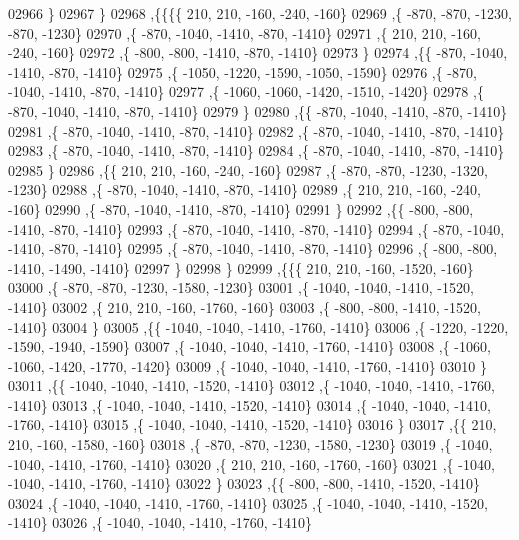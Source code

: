 \begin{DoxyCode}
02966    \}
02967   \}
02968  ,\{\{\{\{   210,   210,  -160,  -240,  -160\}
02969     ,\{  -870,  -870, -1230,  -870, -1230\}
02970     ,\{  -870, -1040, -1410,  -870, -1410\}
02971     ,\{   210,   210,  -160,  -240,  -160\}
02972     ,\{  -800,  -800, -1410,  -870, -1410\}
02973     \}
02974    ,\{\{  -870, -1040, -1410,  -870, -1410\}
02975     ,\{ -1050, -1220, -1590, -1050, -1590\}
02976     ,\{  -870, -1040, -1410,  -870, -1410\}
02977     ,\{ -1060, -1060, -1420, -1510, -1420\}
02978     ,\{  -870, -1040, -1410,  -870, -1410\}
02979     \}
02980    ,\{\{  -870, -1040, -1410,  -870, -1410\}
02981     ,\{  -870, -1040, -1410,  -870, -1410\}
02982     ,\{  -870, -1040, -1410,  -870, -1410\}
02983     ,\{  -870, -1040, -1410,  -870, -1410\}
02984     ,\{  -870, -1040, -1410,  -870, -1410\}
02985     \}
02986    ,\{\{   210,   210,  -160,  -240,  -160\}
02987     ,\{  -870,  -870, -1230, -1320, -1230\}
02988     ,\{  -870, -1040, -1410,  -870, -1410\}
02989     ,\{   210,   210,  -160,  -240,  -160\}
02990     ,\{  -870, -1040, -1410,  -870, -1410\}
02991     \}
02992    ,\{\{  -800,  -800, -1410,  -870, -1410\}
02993     ,\{  -870, -1040, -1410,  -870, -1410\}
02994     ,\{  -870, -1040, -1410,  -870, -1410\}
02995     ,\{  -870, -1040, -1410,  -870, -1410\}
02996     ,\{  -800,  -800, -1410, -1490, -1410\}
02997     \}
02998    \}
02999   ,\{\{\{   210,   210,  -160, -1520,  -160\}
03000     ,\{  -870,  -870, -1230, -1580, -1230\}
03001     ,\{ -1040, -1040, -1410, -1520, -1410\}
03002     ,\{   210,   210,  -160, -1760,  -160\}
03003     ,\{  -800,  -800, -1410, -1520, -1410\}
03004     \}
03005    ,\{\{ -1040, -1040, -1410, -1760, -1410\}
03006     ,\{ -1220, -1220, -1590, -1940, -1590\}
03007     ,\{ -1040, -1040, -1410, -1760, -1410\}
03008     ,\{ -1060, -1060, -1420, -1770, -1420\}
03009     ,\{ -1040, -1040, -1410, -1760, -1410\}
03010     \}
03011    ,\{\{ -1040, -1040, -1410, -1520, -1410\}
03012     ,\{ -1040, -1040, -1410, -1760, -1410\}
03013     ,\{ -1040, -1040, -1410, -1520, -1410\}
03014     ,\{ -1040, -1040, -1410, -1760, -1410\}
03015     ,\{ -1040, -1040, -1410, -1520, -1410\}
03016     \}
03017    ,\{\{   210,   210,  -160, -1580,  -160\}
03018     ,\{  -870,  -870, -1230, -1580, -1230\}
03019     ,\{ -1040, -1040, -1410, -1760, -1410\}
03020     ,\{   210,   210,  -160, -1760,  -160\}
03021     ,\{ -1040, -1040, -1410, -1760, -1410\}
03022     \}
03023    ,\{\{  -800,  -800, -1410, -1520, -1410\}
03024     ,\{ -1040, -1040, -1410, -1760, -1410\}
03025     ,\{ -1040, -1040, -1410, -1520, -1410\}
03026     ,\{ -1040, -1040, -1410, -1760, -1410\}

\end{DoxyCode}
